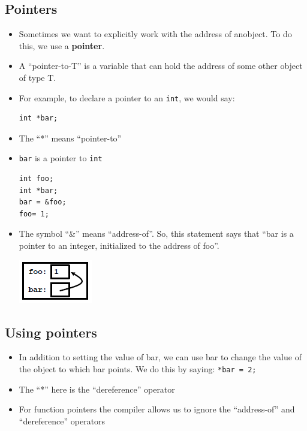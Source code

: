 \subsection{Pointers}
\begin{itemize}
	\item Sometimes we want to explicitly work with the address of anobject. To do this, we use a \textbf{pointer}.
	\item A ``pointer-to-T'' is a variable that can hold the address of some other object of type T.
	\item For example, to declare a pointer to an \lstinline[style=C++]{int}, we would say:
\begin{lstlisting}[style=C++]
int *bar;
\end{lstlisting}

	\item The ``*'' means ``pointer-to''
	\item \lstinline[style=C++]{bar} is a pointer to \lstinline[style=C++]{int}
\begin{lstlisting}[style=C++]
int foo;
int *bar;
bar = &foo;
foo= 1;
\end{lstlisting}
	\item The symbol ``\&'' means ``address-of''. So, this statement says that ``bar is a pointer to an integer, initialized to the address of foo''.
\begin{center}
	\includegraphics{sections/lec6/ex.png}
\end{center}
\end{itemize}

\subsection{Using pointers}
\begin{itemize}
	\item In addition to setting the value of bar, we can use bar to change the value of the object to which bar points. We do this by saying: \lstinline[style=C++]{*bar = 2;}
	\item The ``*'' here is the ``dereference'' operator
	\item For function pointers the compiler allows us to ignore the ``address-of'' and ``dereference'' operators
\end{itemize}